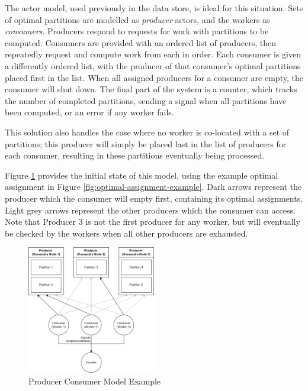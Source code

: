 The actor model, used previously in the data store, is ideal for this situation. Sets of optimal partitions are modelled as \textit{producer} actors, and the workers as \textit{consumers}. Producers respond to requests for work with partitions to be computed. Consumers are provided with an ordered list of producers, then repeatedly request and compute work from each in order. Each consumer is given a differently ordered list, with the producer of that consumer's optimal partitions placed first in the list. When all assigned producers for a consumer are empty, the consumer will shut down. The final part of the system is a counter, which tracks the number of completed partitions, sending a signal when all partitions have been computed, or an error if any worker fails.

This solution also handles the case where no worker is co-located with a set of partitions; this producer will simply be placed last in the list of producers for each consumer, resulting in these partitions eventually being processed.

Figure \ref{fig:producer-consumer-model-example} provides the initial state of this model, using the example optimal assignment in Figure \ref{fig:optimal-assignment-example}. Dark arrows represent the producer which the consumer will empty first, containing its optimal assignments. Light grey arrows represent the other producers which the consumer can access. Note that Producer 3 is not the first producer for any worker, but will eventually be checked by the workers when all other producers are exhausted.

\begin{figure}[h]
	\centering
	\includegraphics[width=0.5\textwidth]{chapters/diagrams/implementation/producer-consumer-model-example}
	\caption{Producer Consumer Model Example}
	\label{fig:producer-consumer-model-example}
\end{figure}

